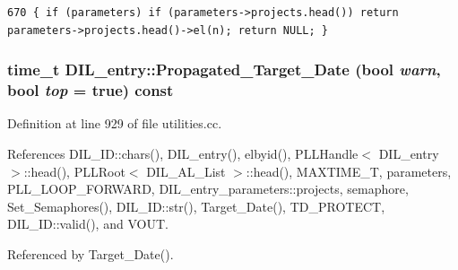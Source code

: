 \footnotesize\begin{verbatim}670 { if (parameters) if (parameters->projects.head()) return parameters->projects.head()->el(n); return NULL; }
\end{verbatim}\normalsize 
{}
\subsubsection{\setlength{\rightskip}{0pt plus 5cm}time\_\-t DIL\_\-entry::Propagated\_\-Target\_\-Date (bool {\em warn}, bool {\em top} = {\bf true}) const}\label{classDIL__entry_a11}




Definition at line 929 of file utilities.cc.

References DIL\_\-ID::chars(), DIL\_\-entry(), elbyid(), PLLHandle$<$ DIL\_\-entry $>$::head(), PLLRoot$<$ DIL\_\-AL\_\-List $>$::head(), MAXTIME\_\-T, parameters, PLL\_\-LOOP\_\-FORWARD, DIL\_\-entry\_\-parameters::projects, semaphore, Set\_\-Semaphores(), DIL\_\-ID::str(), Target\_\-Date(), TD\_\-PROTECT, DIL\_\-ID::valid(), and VOUT.

Referenced by Target\_\-Date().




